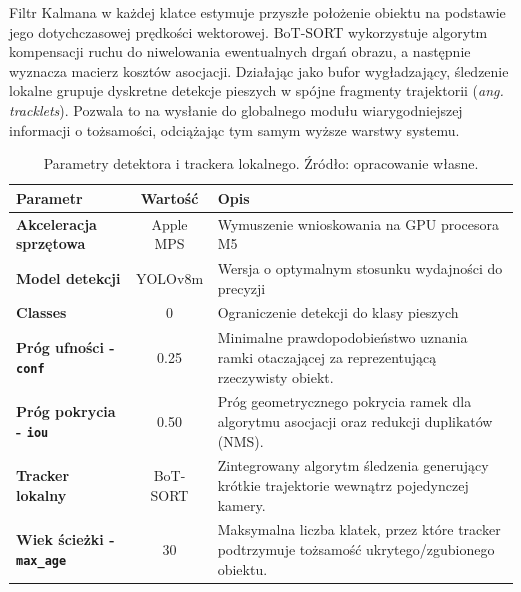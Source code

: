 Filtr Kalmana w każdej klatce estymuje przyszłe położenie obiektu na podstawie jego dotychczasowej
prędkości wektorowej. BoT-SORT wykorzystuje algorytm kompensacji ruchu do niwelowania ewentualnych
drgań obrazu, a następnie wyznacza macierz kosztów asocjacji. Działając jako bufor wygładzający,
śledzenie lokalne grupuje dyskretne detekcje pieszych w spójne fragmenty trajektorii (\textit{ang.
  tracklets}). Pozwala to na wysłanie do globalnego modułu wiarygodniejszej informacji o tożsamości,
odciążając tym samym wyższe warstwy systemu.

\begin{table}[htbp]
  \centering
  \caption{Parametry detektora i trackera lokalnego. Źródło: opracowanie własne.}
  \label{tab:params_local_tracker}
  \renewcommand{\arraystretch}{1.2}
  \begin{tabular}{|l|c|p{8cm}|}
    \hline
    \textbf{Parametr}                         & \textbf{Wartość} & \textbf{Opis}                                                                                    \\ \hline
    \textbf{Akceleracja sprzętowa}            & Apple MPS        & Wymuszenie wnioskowania na GPU procesora M5                                                      \\ \hline
    \textbf{Model detekcji}                   & YOLOv8m          & Wersja o optymalnym stosunku wydajności do precyzji                                              \\ \hline
    \textbf{Classes}                          & 0                & Ograniczenie detekcji do klasy pieszych                                                          \\ \hline
    \textbf{Próg ufności - \texttt{conf}}     & 0.25             & Minimalne prawdopodobieństwo uznania ramki otaczającej za reprezentującą rzeczywisty obiekt.     \\ \hline
    \textbf{Próg pokrycia - \texttt{iou}}     & 0.50             & Próg geometrycznego pokrycia ramek dla algorytmu asocjacji oraz redukcji duplikatów (NMS).       \\ \hline
    \textbf{Tracker lokalny}                  & BoT-SORT         & Zintegrowany algorytm śledzenia generujący krótkie trajektorie wewnątrz pojedynczej kamery.      \\ \hline
    \textbf{Wiek ścieżki - \texttt{max\_age}} & 30               & Maksymalna liczba klatek, przez które tracker podtrzymuje tożsamość ukrytego/zgubionego obiektu. \\ \hline

  \end{tabular}
\end{table}

